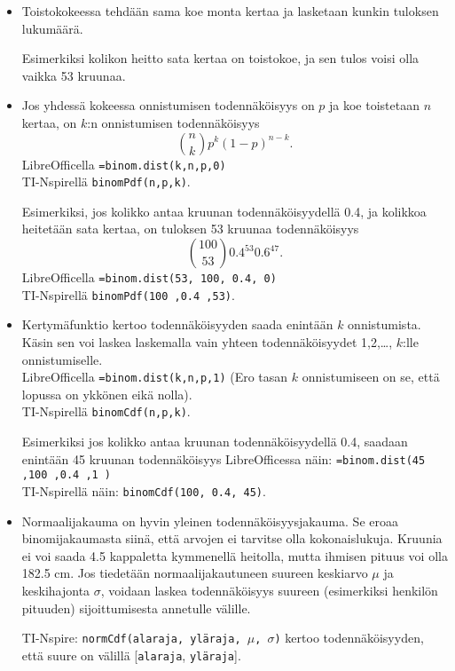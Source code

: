 \documentclass[12pt,leqno,a4paper,oneside]{amsart}
\theoremstyle{definition}
\theoremstyle{remark}
\numberwithin{equation}{section}
\begin{document}
\begin{itemize}
 \item 
 Toistokokeessa tehdään sama koe monta kertaa ja lasketaan kunkin tuloksen lukumäärä.
 
 Esimerkiksi kolikon heitto sata kertaa on toistokoe, ja sen tulos voisi olla vaikka 53 kruunaa.
 
 \item
 Jos yhdessä kokeessa onnistumisen todennäköisyys on $p$ ja koe toistetaan $n$ kertaa, on $k$:n onnistumisen todennäköisyys 
 $${n \choose k} p^k (1-p)^{n-k} .$$
 LibreOfficella \texttt{=binom.dist(k,n,p,0)}\\
 TI-Nspirellä \texttt{binomPdf(n,p,k)}.
 
 Esimerkiksi, jos kolikko antaa kruunan todennäköisyydellä 0.4, ja kolikkoa heitetään sata kertaa, on tuloksen 53 kruunaa todennäköisyys
 $${100 \choose 53} 0.4^{53} 0.6^{47} .$$
 LibreOfficella \texttt{=binom.dist(53, 100, 0.4, 0)}\\
 TI-Nspirellä \texttt{binomPdf(100 ,0.4 ,53)}.
 
 
 \item
 Kertymäfunktio kertoo todennäköisyyden saada enintään $k$ onnistumista. Käsin sen voi laskea laskemalla vain yhteen todennäköisyydet
 1,2,\ldots , $k$:lle onnistumiselle.\\
 LibreOfficella
 \texttt{=binom.dist(k,n,p,1)} (Ero tasan $k$ onnistumiseen on se, että lopussa on ykkönen eikä nolla).\\
 TI-Nspirellä \texttt{binomCdf(n,p,k)}.
 
 Esimerkiksi jos kolikko antaa kruunan todennäköisyydellä 0.4, saadaan enintään 45 kruunan todennäköisyys LibreOfficessa näin:
 \texttt{=binom.dist(45 ,100 ,0.4 ,1 )}\\
 TI-Nspirellä näin: \texttt{binomCdf(100, 0.4, 45)}.
 
 \item
 Normaalijakauma on hyvin yleinen todennäköisyysjakauma. Se eroaa binomijakaumasta siinä, että arvojen ei tarvitse olla kokonaislukuja.
 Kruunia ei voi saada 4.5 kappaletta kymmenellä heitolla, mutta ihmisen pituus voi olla 182.5 cm. Jos tiedetään normaalijakautuneen
 suureen keskiarvo $\mu$ ja keskihajonta $\sigma$, voidaan laskea todennäköisyys suureen (esimerkiksi henkilön pituuden) sijoittumisesta annetulle
 välille.
 
 TI-Nspire: \texttt{normCdf(alaraja, yläraja, $\mu$, $\sigma$)} kertoo toden\-näköisyyden, että suure on välillä [\texttt{alaraja}, \texttt{yläraja}].


\end{itemize}
\end{document}
